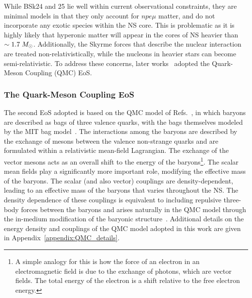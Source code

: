 While BSk24 and 25 lie well within current observational constraints, they are minimal models in that they only account for $npe\mu$ matter, and do not incorporate any exotic species within the NS core. This is problematic as it is highly likely that hyperonic matter will appear in the cores of NS heavier than $\sim 1.7\;M_\odot$.  Additionally, the Skyrme forces that describe the nuclear interaction are treated non-relativistically, while the nucleons in heavier stars can become semi-relativistic. To address these concerns, later works~\cite{Anzuini:2021lnv_nov_Improvedtreatmentdark, Bell:2023ysh_dec_ThermalizationAnnihilationDark} adopted the Quark-Meson Coupling (QMC) EoS.



\subsubsection*{The Quark-Meson Coupling EoS}

The second EoS adopted is based on the QMC model of Refs.~\cite{Guichon:1987jp_Possiblequarkmechanism,Guichon:1995ue_Rolenucleonstructure, Saito:2005rv_Nucleonhadronstructure,Guichon:2018uew_QuarkMesonCouplingQMC}, in which baryons are described as bags of three valence quarks, with the bags themselves modeled by the MIT bag model~\cite{Chodos:1974pn_Baryonstructurebag}. The interactions among the baryons are described by the exchange of mesons between the valence non-strange quarks and are formulated within a relativistic mean-field Lagrangian. The exchange of the vector mesons acts as an overall shift to the energy of the baryons\footnote{A simple analogy for this is how the force of an electron in an electromagnetic field is due to the exchange of photons, which are vector fields. The total energy of the electron is a shift relative to the free electron energy.}. The scalar mean fields play a significantly more important role, modifying the effective mass of the baryons. The scalar (and also vector) couplings are density-dependent, leading to an effective mass of the baryons that varies throughout the NS. The density dependence of these couplings is equivalent to including repulsive three-body forces between the baryons and arises naturally in the QMC model through the in-medium modification of the baryonic structure~\cite{Guichon:2004xg_Quarkstructurenuclear,Thomas:2021kio_jul_Rolequarksnuclear}. Additional details on the energy density and couplings of the QMC model adopted in this work are given in Appendix~\ref{appendix:QMC_details}.

